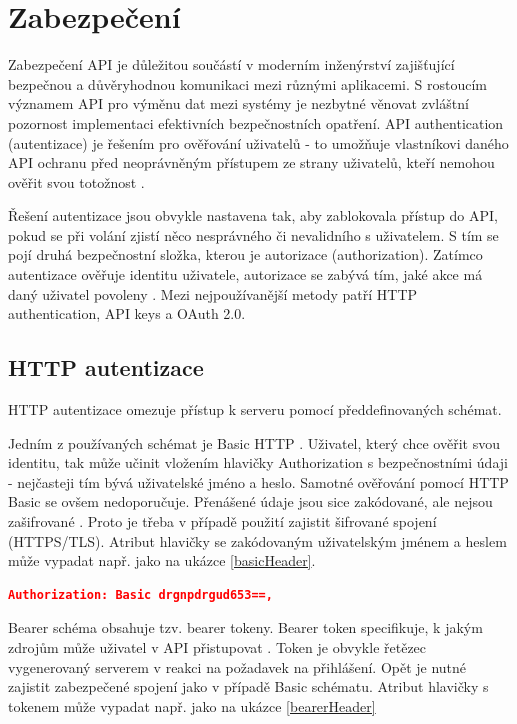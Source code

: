 \documentclass[czech, bc, kiv, he, iso690numb]{fasthesis}
\begin{document}
%
%
\section{Zabezpečení}
Zabezpečení API je důležitou součástí v moderním inženýrství zajišťující bezpečnou a důvěryhodnou komunikaci mezi různými aplikacemi. S rostoucím významem API pro výměnu dat mezi
systémy je nezbytné věnovat zvláštní pozornost implementaci efektivních bezpečnostních opatření. API authentication (autentizace) je řešením pro ověřování uživatelů - to umožňuje
vlastníkovi daného API ochranu před neoprávněným přístupem ze strany uživatelů, kteří nemohou ověřit svou totožnost \cite{whatIsAPI}.

Řešení autentizace jsou obvykle nastavena tak, aby zablokovala přístup do API, pokud se při volání zjistí něco nesprávného či nevalidního s uživatelem. S tím se pojí druhá bezpečnostní
složka, kterou je autorizace (authorization). Zatímco autentizace ověřuje identitu uživatele, autorizace se zabývá tím, jaké akce má daný uživatel povoleny \cite{mostUsedAuthentication}. 
Mezi nejpoužívanější metody patří HTTP authentication, API keys a OAuth 2.0. 

\subsection{HTTP autentizace}
HTTP autentizace omezuje přístup k serveru pomocí předdefinovaných schémat. 

Jedním z používaných schémat je Basic HTTP \cite{mozillaHTTPAuth}. Uživatel, který chce ověřit svou identitu, tak může učinit vložením hlavičky 
Authorization s bezpečnostními údaji - nejčasteji tím bývá uživatelské jméno a heslo. 
Samotné ověřování pomocí HTTP Basic se ovšem nedoporučuje. Přenášené údaje jsou sice zakódované, ale nejsou zašifrované \cite{mozillaHTTPAuth}. Proto je třeba v případě použití zajistit šifrované spojení (HTTPS/TLS). Atribut hlavičky se zakódovaným uživatelským jménem a heslem může vypadat např. jako na ukázce \ref{basicHeader}.

\begin{lstlisting}[language=json, caption={Autorizační atribut - Basic schéma}, label=basicHeader]
	Authorization: Basic drgnpdrgud653==,
\end{lstlisting}

Bearer schéma obsahuje tzv. bearer tokeny. Bearer token specifikuje, k jakým zdrojům může uživatel v API přistupovat \cite{mostUsedAuthentication}. Token je obvykle řetězec vygenerovaný serverem v reakci na požadavek na přihlášení. Opět je nutné zajistit zabezpečené spojení jako v případě Basic schématu. Atribut hlavičky s tokenem může vypadat např. jako na ukázce \ref{bearerHeader}
\end{document}
